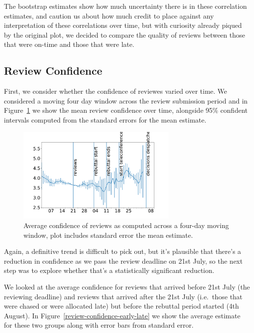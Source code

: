 The bootstrap estimates show how much uncertainty there is in these correlation estimates, and caution us about how much credit to place against any interpretation of these correlations over time, but with curiosity already piqued by the original plot, we decided to compare the quality of reviews between those that were on-time and those that were late.

\subsection{Review Confidence}\label{review-confidence}

First, we consider whether the confidence of reviewes varied over time. We considered a moving four day window across the review submission period and in Figure~\ref{review-confidence-time} we show the mean review confidence over time, alongside 95\% confident intervals computed from the standard errors for the mean estimate. 

\begin{figure}[htb]
\centering
\includegraphics[width=0.70\textwidth]{diagrams/neurips/review-confidence-time.pdf}


\caption{Average confidence of reviews as computed across a four-day moving window, plot includes standard error the mean estimate.}
\label{review-confidence-time}
\end{figure}

Again, a definitive trend is difficult to pick out, but it's plausible that there's a reduction in confidence as we pass the review deadline on 21st July, so the next step was to explore whether that's a statistically significant reduction.

We looked at the average confidence for
reviews that arrived before 21st July (the reviewing deadline) and
reviews that arrived after the 21st July (i.e.~those that were chased or
were allocated late) but before the rebuttal period started (4th
August). In Figure~\ref{review-confidence-early-late} we show the average estimate for these two groups along with error bars from standard error.

